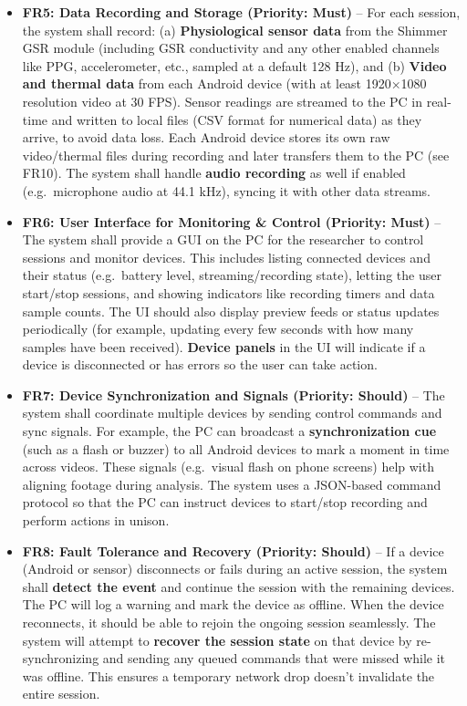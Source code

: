\documentclass[12pt,a4paper]{article}
\begin{document}
\begin{itemize}
\item
  \textbf{FR5: Data Recording and Storage (Priority: Must)} -- For each session, the system shall record: (a) \textbf{Physiological sensor data} from the Shimmer GSR module (including GSR conductivity and any other enabled channels like PPG, accelerometer, etc., sampled at a default 128 Hz), and (b) \textbf{Video and thermal data} from each Android device (with at least 1920×1080 resolution video at 30 FPS). Sensor readings are streamed to the PC in real-time and written to local files (CSV format for numerical data) as they arrive, to avoid data loss. Each Android device stores its own raw video/thermal files during recording and later transfers them to the PC (see FR10). The system shall handle \textbf{audio recording} as well if enabled (e.g.~microphone audio at 44.1 kHz), syncing it with other data streams.
\item
  \textbf{FR6: User Interface for Monitoring \& Control (Priority: Must)} -- The system shall provide a GUI on the PC for the researcher to control sessions and monitor devices. This includes listing connected devices and their status (e.g.~battery level, streaming/recording state), letting the user start/stop sessions, and showing indicators like recording timers and data sample counts. The UI should also display preview feeds or status updates periodically (for example, updating every few seconds with how many samples have been received). \textbf{Device panels} in the UI will indicate if a device is disconnected or has errors so the user can take action.
\item
  \textbf{FR7: Device Synchronization and Signals (Priority: Should)} -- The system shall coordinate multiple devices by sending control commands and sync signals. For example, the PC can broadcast a \textbf{synchronization cue} (such as a flash or buzzer) to all Android devices to mark a moment in time across videos. These signals (e.g.~visual flash on phone screens) help with aligning footage during analysis. The system uses a JSON-based command protocol so that the PC can instruct devices to start/stop recording and perform actions in unison.
\item
  \textbf{FR8: Fault Tolerance and Recovery (Priority: Should)} -- If a device (Android or sensor) disconnects or fails during an active session, the system shall \textbf{detect the event} and continue the session with the remaining devices. The PC will log a warning and mark the device as offline. When the device reconnects, it should be able to rejoin the ongoing session seamlessly. The system will attempt to \textbf{recover the session state} on that device by re-synchronizing and sending any queued commands that were missed while it was offline. This ensures a temporary network drop doesn't invalidate the entire session.

\end{itemize}
\end{document}
